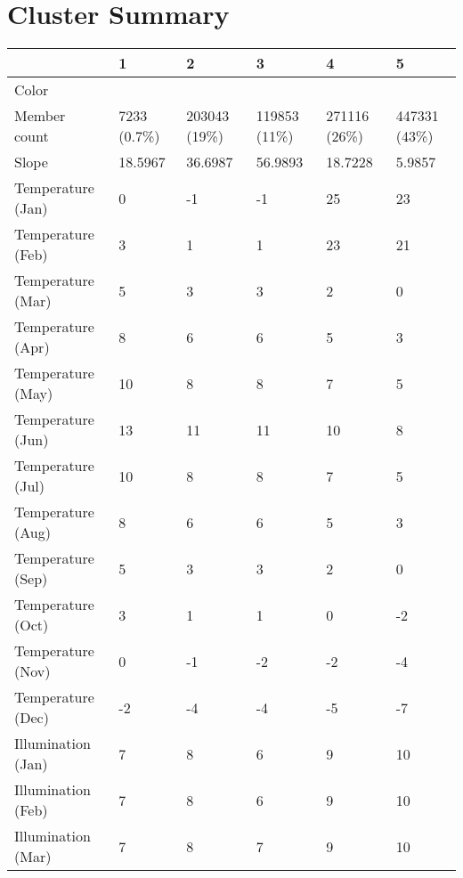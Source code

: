 \chapter{Cluster Summary} \label{AppendixA}

\begin{table}[]
  \centering
	    \begin{tabular}{|p{5cm}|p{2cm}|p{2cm}|p{2cm}|p{2cm}|p{2cm}|}
		\hline	
  	     & \textbf{1} &  \textbf{2} & \textbf{3} & \textbf{4} & \textbf{5} \\
		\hline
  	    Color & \cellcolor{cluster_1} & \cellcolor{cluster_2} & \cellcolor{cluster_3} & \cellcolor{cluster_4} & \cellcolor{cluster_5} \\
		\hline
  	    Member count & 7233 (0.7\%)  & 203043 (19\%) & 119853 (11\%)  & 271116 (26\%) & 447331 (43\%) \\
		\hline
  	    Slope & 18.5967 & 36.6987 & 56.9893 & 18.7228 & 5.9857 \\
		\hline
  	    Temperature (Jan) & 0 & -1 & -1 & 25 & 23 \\
		\hline
  	    Temperature (Feb) & 3 & 1 & 1 & 23 & 21 \\
		\hline
  	    Temperature (Mar) & 5 & 3 & 3 & 2 & 0 \\
		\hline
  	    Temperature (Apr) & 8 & 6 & 6 & 5 & 3 \\
		\hline
  	    Temperature (May) & 10 & 8 & 8 & 7 & 5 \\
		\hline
		Temperature (Jun) & 13 & 11 & 11 & 10 & 8 \\
		\hline
		Temperature (Jul) & 10 & 8 & 8 & 7 & 5 \\
		\hline
		Temperature (Aug) & 8 & 6 & 6 & 5 & 3 \\
		\hline
		Temperature (Sep) & 5 & 3 & 3 & 2 & 0 \\
		\hline
		Temperature (Oct) & 3 & 1 & 1 & 0 & -2 \\
		\hline
		Temperature (Nov) & 0 & -1 & -2 & -2 & -4 \\
		\hline
		Temperature (Dec) & -2 & -4 & -4 & -5 & -7 \\
		\hline
  	    Illumination (Jan) & 7 & 8 & 6 & 9 & 10 \\
		\hline
  	    Illumination (Feb) & 7 & 8 & 6 & 9 & 10 \\
		\hline
  	    Illumination (Mar) & 7 & 8 & 7 & 9 & 10 \\

\end{tabular}
\end{table}
